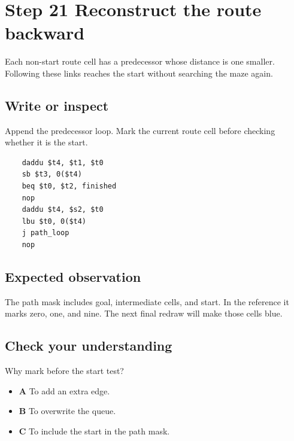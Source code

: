 \section{Step 21 Reconstruct the route backward}\label{maze-s21}

Each non-start route cell has a predecessor whose distance is one smaller. Following these links reaches the start without searching the maze again.

\subsection{Write or inspect}

Append the predecessor loop. Mark the current route cell before checking whether it is the start.

\begin{verbatim}
    daddu $t4, $t1, $t0
    sb $t3, 0($t4)
    beq $t0, $t2, finished
    nop
    daddu $t4, $s2, $t0
    lbu $t0, 0($t4)
    j path_loop
    nop
\end{verbatim}

\subsection{Expected observation}

The path mask includes goal, intermediate cells, and start. In the reference it marks zero, one, and nine. The next final redraw will make those cells blue.

\subsection{Check your understanding}

Why mark before the start test?

\begin{itemize}
  \item \textbf{A} To add an extra edge.
  \item \textbf{B} To overwrite the queue.
  \item \textbf{C} To include the start in the path mask.
\end{itemize}
